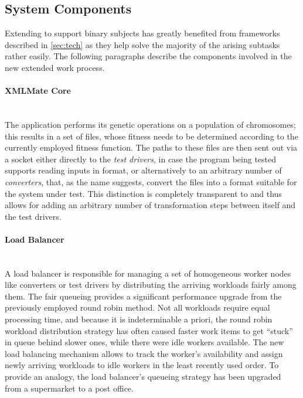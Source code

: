 \subsection{System Components}
\label{sec:components}
Extending \xmlmate to support binary subjects has greatly benefited from frameworks described in
\cref{sec:tech} as they help solve the majority of the arising subtasks rather easily. The following
paragraphs describe the components involved in the new extended \xmlmate work process.
\paragraph{XMLMate Core} ~\\
  The \java application \xmlmate performs its genetic operations on a population of chromosomes; this 
  results in a set of \xml files, whose fitness needs to be determined according to the currently employed
  fitness function. The paths to these files are then sent out via a \zmq socket either directly to the
  \emph{test drivers}, in case the program being tested supports reading inputs in \xml format, or alternatively 
  to an arbitrary number of \emph{converters}, that, as the name suggests, convert the \xml files into a format 
  suitable for the system under test. This distinction is completely transparent to \xmlmate and thus allows for 
  adding an arbitrary number of transformation steps between itself and the test drivers.
  \paragraph{Load Balancer} ~\\
  A load balancer is responsible for managing a set of homogeneous worker nodes like converters or test
  drivers by distributing the arriving workloads fairly among them. The fair queueing provides a significant
  performance upgrade from the previously employed round robin method. Not all workloads require equal
  processing time, and because it is indeterminable a priori, the round robin workload distribution strategy
  has often caused faster work items to get ``stuck'' in queue behind slower ones, while there were idle
  workers available. The new load balancing mechanism allows to track the worker's availability and assign
  newly arriving workloads to idle workers in the least recently used order. To provide an analogy, the load
  balancer's queueing strategy has been upgraded from a supermarket to a post office. 
  
